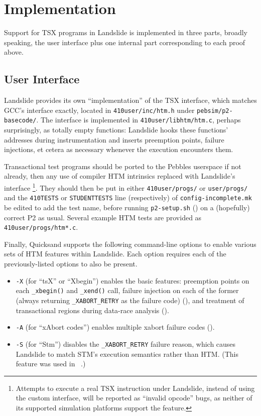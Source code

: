 
\section{Implementation}

Support for TSX programs in Landslide is implemented in three parts, broadly speaking,
the user interface plus one internal part corresponding to each proof above.

\subsection{User Interface}

Landslide provides its own ``implementation'' of the TSX interface,
which matches GCC's interface exactly,
located in {\tt 410user/inc/htm.h}
under {\tt pebsim/p2-basecode/}.
The interface is implemented in {\tt 410user/libhtm/htm.c},
perhaps surprisingly, as totally empty functions:
Landslide hooks these functions' addresses during instrumentation
and inserts preemption points, failure injections,
et cetera as necessary whenever the execution encounters them.

Transactional test programs should be ported to the Pebbles userspace if not already,
then any use of compiler HTM intrinsics replaced with Landslide's interface%
\footnote{Attempts to execute a real TSX instruction under Landslide, instead of using the custom interface,
will be reported as ``invalid opcode'' bugs,
as neither of its supported simulation platforms support the feature.
}.
They should then be put in either {\tt 410user/progs/} or {\tt user/progs/}
and the {\tt 410TESTS} or {\tt STUDENTTESTS} line (respectively) of {\tt config-incomplete.mk} be edited to add the test name,
before running {\tt p2-setup.sh} (\sect{\ref{sec:landslide-setup}})
on a (hopefully) correct P2 as usual.
Several example HTM tests are provided as {\tt 410user/progs/htm*.c}.

Finally, Quicksand supports the following command-line options to enable various sets of HTM features within Landslide.
Each option requires each of the previously-listed options to also be present.
\begin{itemize}
	\item {\tt -X} (for ``tsX'' or ``Xbegin'') enables the basic features:
		preemption points on each {\tt \_xbegin()} and {\tt \_xend()} call,
		failure injection on each of the former
		(always returning {\tt \_XABORT\_RETRY} as the failure code)
		(\sect{\ref{sec:txn-failure}}),
		and treatment of transactional regions during data-race analysis (\sect{\ref{sec:txn-datarace}}).
	\item {\tt -A} (for ``xAbort codes'')
		enables multiple xabort failure codes (\sect{\ref{sec:txn-failure}}).
	\item {\tt -S} (for ``Stm'')
		disables the {\tt \_XABORT\_RETRY} failure reason,
		which causes Landslide to match STM's execution semantics rather than HTM.
		(This feature was used in \cite{sigbovik-htm}~.)
\end{itemize}

